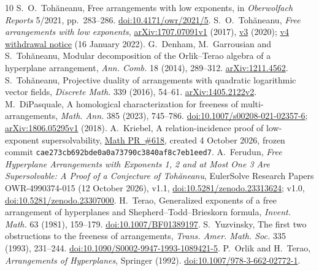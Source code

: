\documentclass[11pt]{article}
\begin{document}
\begin{thebibliography}{10}
 S.~O.~Toh\u{a}neanu, Free arrangements with low exponents, in \emph{Oberwolfach Reports} 5/2021, pp.~283--286. \href{https://doi.org/10.4171/owr/2021/5}{doi:10.4171/owr/2021/5}.
 S.~O.~Toh\u{a}neanu, \emph{Free arrangements with low exponents}, \href{https://arxiv.org/abs/1707.07091v1}{arXiv:1707.07091v1} (2017), \href{https://arxiv.org/abs/1707.07091v3}{v3} (2020); \href{https://arxiv.org/abs/1707.07091v4}{v4 withdrawal notice} (16 January 2022).
 G.~Denham, M.~Garrousian and S.~Toh\u{a}neanu, Modular decomposition of the Orlik--Terao algebra of a hyperplane arrangement, \emph{Ann. Comb.} 18 (2014), 289--312. \href{https://arxiv.org/abs/1211.4562}{arXiv:1211.4562}.
 S.~Toh\u{a}neanu, Projective duality of arrangements with quadratic logarithmic vector fields, \emph{Discrete Math.} 339 (2016), 54--61. \href{https://arxiv.org/abs/1405.2122v2}{arXiv:1405.2122v2}.
 M.~DiPasquale, A homological characterization for freeness of multi-arrangements, \emph{Math. Ann.} 385 (2023), 745--786. \href{https://doi.org/10.1007/s00208-021-02357-6}{doi:10.1007/s00208-021-02357-6}; \href{https://arxiv.org/abs/1806.05295v1}{arXiv:1806.05295v1} (2018).
 A.~Kriebel, A relation-incidence proof of low-exponent supersolvability, \href{https://github.com/AlecKriebel/Math/pull/618}{Math PR~\#618}, created 4 October 2026, frozen commit \texttt{cae273cb692bde0a0a73790c3840af8c7eb1eed7}.
 A.~Ferudun, \emph{Free Hyperplane Arrangements with Exponents 1, 2 and at Most One 3 Are Supersolvable: A Proof of a Conjecture of Toh\u{a}neanu}, EulerSolve Research Papers OWR-4990374-015 (12 October 2026), v1.1, \href{https://doi.org/10.5281/zenodo.23313624}{doi:10.5281/zenodo.23313624}; v1.0, \href{https://doi.org/10.5281/zenodo.23307000}{doi:10.5281/zenodo.23307000}.
 H.~Terao, Generalized exponents of a free arrangement of hyperplanes and Shepherd--Todd--Brieskorn formula, \emph{Invent. Math.} 63 (1981), 159--179. \href{https://doi.org/10.1007/BF01389197}{doi:10.1007/BF01389197}.
 S.~Yuzvinsky, The first two obstructions to the freeness of arrangements, \emph{Trans. Amer. Math. Soc.} 335 (1993), 231--244. \href{https://doi.org/10.1090/S0002-9947-1993-1089421-5}{doi:10.1090/S0002-9947-1993-1089421-5}.
 P.~Orlik and H.~Terao, \emph{Arrangements of Hyperplanes}, Springer (1992). \href{https://doi.org/10.1007/978-3-662-02772-1}{doi:10.1007/978-3-662-02772-1}.
\end{thebibliography}
\end{document}
